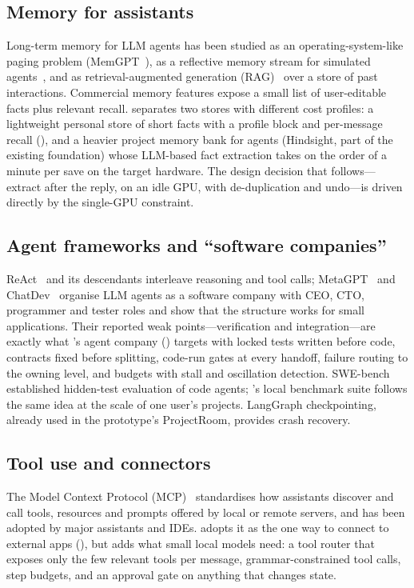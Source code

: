 \subsection{Memory for assistants}
Long-term memory for LLM agents has been studied as an operating-system-like paging problem (MemGPT~\cite{memgpt}), as a reflective memory stream for simulated agents~\cite{park2023}, and as retrieval-augmented generation (RAG)~\cite{lewis2020} over a store of past interactions. Commercial memory features expose a small list of user-editable facts plus relevant recall. \hivi{} separates two stores with different cost profiles: a lightweight personal store of short facts with a profile block and per-message recall (), and a heavier project memory bank for agents (Hindsight, part of the existing foundation) whose LLM-based fact extraction takes on the order of a minute per save on the target hardware. The design decision that follows---extract after the reply, on an idle GPU, with de-duplication and undo---is driven directly by the single-GPU constraint.

\subsection{Agent frameworks and ``software companies''}
ReAct~\cite{react} and its descendants interleave reasoning and tool calls; MetaGPT~\cite{metagpt} and ChatDev~\cite{chatdev} organise LLM agents as a software company with CEO, CTO, programmer and tester roles and show that the structure works for small applications. Their reported weak points---verification and integration---are exactly what \hivi{}'s agent company () targets with locked tests written before code, contracts fixed before splitting, code-run gates at every handoff, failure routing to the owning level, and budgets with stall and oscillation detection. SWE-bench~\cite{swebench} established hidden-test evaluation of code agents; \hivi{}'s local benchmark suite follows the same idea at the scale of one user's projects. LangGraph checkpointing, already used in the prototype's ProjectRoom, provides crash recovery.

\subsection{Tool use and connectors}
The Model Context Protocol (MCP)~\cite{mcp} standardises how assistants discover and call tools, resources and prompts offered by local or remote servers, and has been adopted by major assistants and IDEs. \hivi{} adopts it as the one way to connect to external apps (), but adds what small local models need: a tool router that exposes only the few relevant tools per message, grammar-constrained tool calls, step budgets, and an approval gate on anything that changes state.

